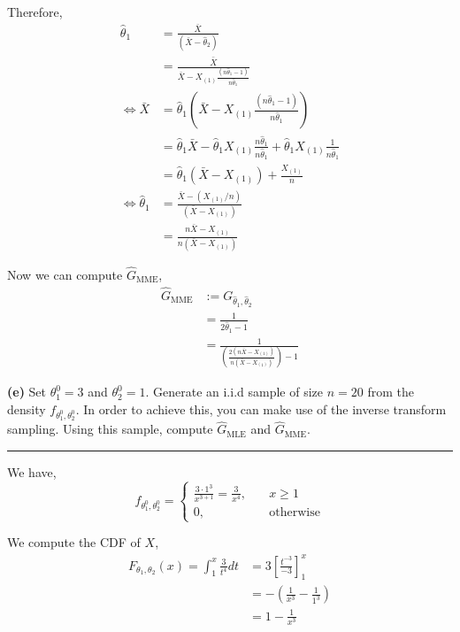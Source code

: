 Therefore, 
\begin{align*}
  \hat{\theta}_1 
    &= \frac{\bar{X}}{(\bar{X} - \hat{\theta}_2)} \\
    &= \frac{\bar{X}}{\bar{X} - X_{(1)}\frac{(n\hat{\theta}_1 - 1)}{n\hat{\theta}_1}} \\
  \iff \bar{X} 
    &= \hat{\theta}_1 \left( \bar{X} - X_{(1)}\frac{(n\hat{\theta}_1 - 1)}{n\hat{\theta}_1} \right) \\
    &=\hat{\theta}_1 \bar{X} - \hat{\theta}_1 X_{(1)}\frac{n\hat{\theta}_1}{n\hat{\theta}_1} + \hat{\theta}_1 X_{(1)}\frac{1}{n\hat{\theta}_1} \\
    &= \hat{\theta}_1 \left( \bar{X} - X_{(1)} \right) + \frac{X_{(1)}}{n} \\
  \iff \hat{\theta}_1 
    &= \frac{\bar{X} - (X_{(1)}/n)}{(\bar{X} - X_{(1)})} \\
    &= \frac{n\bar{X} - X_{(1)}}{n(\bar{X} - X_{(1)})}
\end{align*}

Now we can compute $\hat{G}_{\text{MME}}$,
\begin{align*}
  \hat{G}_{\text{MME}}
    &:= G_{\hat{\theta}_1, \hat{\theta}_2} \\
    &= \frac{1}{2\hat{\theta}_1 - 1} \\
    &= \frac{1}{\left( \frac{2(n\bar{X} - X_{(1)})}{n(\bar{X} - X_{(1)})} \right) - 1}
\end{align*}

\textbf{(e)} Set $\theta_1^0 = 3$ and $\theta_2^0 = 1$. Generate an i.i.d sample of size $n = 20$ from the density $f_{\theta_1^0, \theta_2^0}$. In order to achieve this, you can make use of the inverse transform sampling. Using this sample, compute $\hat{G}_{\text{MLE}}$ and $\hat{G}_{\text{MME}}$.

\begin{center}\rule{6cm}{0.4pt}\end{center}

We have,
\begin{equation*}
  f_{\theta_1^0, \theta_2^0} = 
  \begin{cases}
    \frac{3 \cdot 1^{3}}{x^{3 + 1}} = \frac{3}{x^4}, &\quad x \geq 1 \\
    0,                                &\quad \text{otherwise}
  \end{cases}
\end{equation*}

We compute the CDF of $X$,
\begin{align*}
  F_{\theta_1, \theta_2}(x) = \int_{1}^{x} \frac{3}{t^4} dt 
    &= 3 \left[ \frac{t^{-3}}{-3} \right]_1^{x} \\
    &= - \left( \frac{1}{x^3} - \frac{1}{1^3} \right) \\
    &= 1 - \frac{1}{x^3}
\end{align*}

